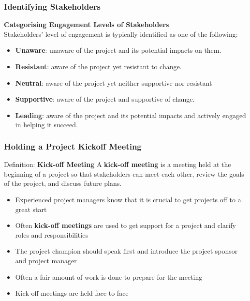 \documentclass[aspectratio=169]{beamer}
\begin{document}
\begin{frame}
\frametitle{Identifying Stakeholders}
\textbf{Categorising Engagement Levels of Stakeholders}\\
\vspace{0.5cm}
Stakeholders' level of engagement is typically identified as one of the following:
\begin{itemize}
\item \textbf{Unaware}: unaware of the project and its potential impacts on them.
\item \textbf{Resistant}: aware of the project yet resistant to change.
\item \textbf{Neutral}: aware of the project yet neither supportive nor resistant
\item \textbf{Supportive}: aware of the project and supportive of change.
\item \textbf{Leading}: aware of the project and its potential impacts and actively engaged in helping it succeed.
\end{itemize}
\end{frame}

\begin{frame}
\frametitle{Holding a Project Kickoff Meeting}
\begin{block}{Definition: \textbf{Kick-off Meeting}}
A \textbf{kick-off meeting} is a meeting held at the beginning of a project so that stakeholders can meet each other, review the goals of the project, and discuss future plans.
\end{block}

\begin{itemize}
\item Experienced project managers know that it is crucial to get projects off to a great start
\item Often \textbf{kick-off meetings} are used to get support for a project and clarify roles and responsibilities
\item The project champion should speak first and introduce the project sponsor and project manager
\item Often a fair amount of work is done to prepare for the meeting
\item Kick-off meetings are held face to face
\end{itemize}
\end{frame}
\end{document}
